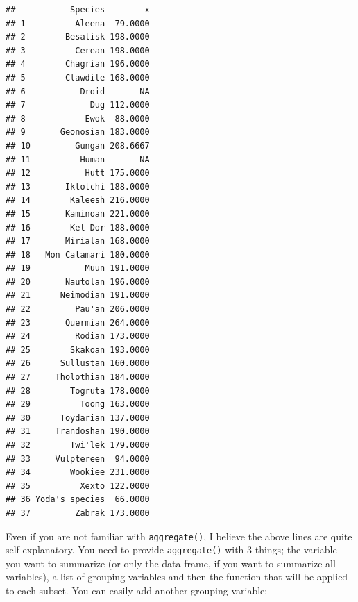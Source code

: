 \documentclass[]{gitbook}
\newenvironment{Shaded}{\begin{snugshade}}{\end{snugshade}}
\newcommand{\DataTypeTok}[1]{\textcolor[rgb]{0.13,0.29,0.53}{#1}}
\newcommand{\KeywordTok}[1]{\textcolor[rgb]{0.13,0.29,0.53}{\textbf{#1}}}
\newcommand{\NormalTok}[1]{#1}
\newcommand{\OperatorTok}[1]{\textcolor[rgb]{0.81,0.36,0.00}{\textbf{#1}}}
\begin{document}
\begin{Shaded}
\end{Shaded}

\begin{verbatim}
##           Species        x
## 1          Aleena  79.0000
## 2        Besalisk 198.0000
## 3          Cerean 198.0000
## 4        Chagrian 196.0000
## 5        Clawdite 168.0000
## 6           Droid       NA
## 7             Dug 112.0000
## 8            Ewok  88.0000
## 9       Geonosian 183.0000
## 10         Gungan 208.6667
## 11          Human       NA
## 12           Hutt 175.0000
## 13       Iktotchi 188.0000
## 14        Kaleesh 216.0000
## 15       Kaminoan 221.0000
## 16        Kel Dor 188.0000
## 17       Mirialan 168.0000
## 18   Mon Calamari 180.0000
## 19           Muun 191.0000
## 20       Nautolan 196.0000
## 21      Neimodian 191.0000
## 22         Pau'an 206.0000
## 23       Quermian 264.0000
## 24         Rodian 173.0000
## 25        Skakoan 193.0000
## 26      Sullustan 160.0000
## 27     Tholothian 184.0000
## 28        Togruta 178.0000
## 29          Toong 163.0000
## 30      Toydarian 137.0000
## 31     Trandoshan 190.0000
## 32        Twi'lek 179.0000
## 33     Vulptereen  94.0000
## 34        Wookiee 231.0000
## 35          Xexto 122.0000
## 36 Yoda's species  66.0000
## 37         Zabrak 173.0000
\end{verbatim}

Even if you are not familiar with \texttt{aggregate()}, I believe the above lines are quite self-explanatory.
You need to provide \texttt{aggregate()} with 3 things; the variable you want to summarize (or only the
data frame, if you want to summarize all variables), a list of grouping variables and then the
function that will be applied to each subset. You can easily add another grouping variable:

\begin{Shaded}
\end{Shaded}
\end{document}
